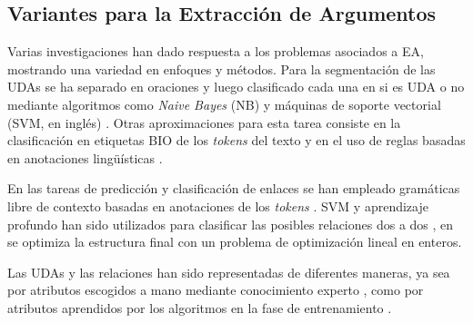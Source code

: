 \documentclass[a4paper,11pt,twocolumn,twoside]{article}
\begin{document}

% 	


\subsection{Variantes para la Extracción de Argumentos}

Varias investigaciones han dado respuesta a los problemas asociados a EA, mostrando
una variedad en enfoques y métodos. Para la segmentación de las UDAs se ha separado
en oraciones y luego clasificado cada una en si es UDA o no mediante algoritmos como 
\textit{Naive Bayes} (NB) y máquinas de soporte vectorial (SVM, en inglés) \cite{palau2009argumentation,goudas2015argument}.
Otras aproximaciones para esta tarea consiste en la clasificación en etiquetas BIO
de los \textit{tokens} del texto \cite{goudas2015argument,stab2017parsing,eger2017neural} y en el uso de
reglas basadas en anotaciones lingüísticas \cite{dykes2020reconstructing}.

En las tareas de predicción y clasificación de enlaces se han empleado gramáticas libre de contexto 
basadas en anotaciones de los \textit{tokens} \cite{palau2009argumentation}. SVM y aprendizaje profundo han sido utilizados para clasificar 
las posibles relaciones dos a dos \cite{goudas2015argument,galassi2021deep}, en 
se optimiza la estructura final con un problema de optimización lineal en enteros.

Las UDAs y las relaciones han sido representadas de diferentes maneras, ya sea por 
atributos escogidos a mano mediante conocimiento experto \cite{palau2009argumentation,goudas2015argument}, como
por atributos aprendidos por los algoritmos en la fase de entrenamiento \cite{eger2017neural,galassi2021deep}.

\end{document}

